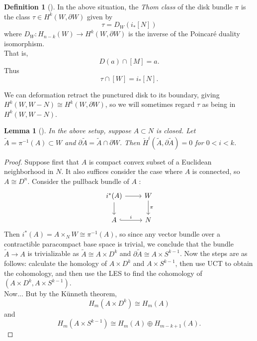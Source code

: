 \documentclass[reqno]{amsart}
\newtheorem{lemma}[theorem]{Lemma}
\theoremstyle{definition}
\newtheorem{definition}[theorem]{Definition}
\theoremstyle{remark}
\begin{document}
\begin{definition}[]
    In the above situation, the \textit{Thom class} of the
    disk bundle $\pi$ is the class $\tau \in 
    H^{k}\left( W, \partial W \right) $ given by
    \[
    \tau = D_W \left( i_* \left[ N \right]  \right) 
    \] 
    where $D_W \colon H_{n-k} (W) \to H^{k}(W, \partial W)$ is
    the inverse of the Poincaré duality isomorphism.\\
    That is,
    \[
    D(a) \cap \left[ M \right]  = a.
    \] 
    Thus
    \[
    \tau \cap \left[ W \right] =
    i_* \left[ N \right] .
    \] 
\end{definition}

We can deformation retract the punctured disk to its boundary, giving
$H^{k}(W, W-N) \cong H^{k}(W, \partial W)$, so we will
sometimes regard
$\tau$ as being in $H^{k}(W, W-N)$.

\begin{lemma}[]
    In the above setup, suppose
    $A \subset N$ is closed. Let
    $\tilde{A} = \pi^{-1}(A) \subset W$ and
    $\partial \tilde{A} = \tilde{A} \cap \partial W$.
    Then
    $\check{H}^{i}\left( \tilde{A},
    \partial \tilde{A} \right) = 0$ for 
    $0<i < k$.
\end{lemma}

\begin{proof}
    Suppose first that
    $A$ is compact convex subset
    of a Euclidean neighborhood in $N$. It also
    suffices consider the case where $A$ is connected,
    so $A \cong D^{n}$.
    Consider the pullback bundle of $A$ :
    \begin{equation*}
    \begin{tikzcd}
        i^{*}(A) \ar[r] \ar[d] & W \ar[d, "\pi"] \\
        A \ar[r, hookrightarrow, "i"] & N
    \end{tikzcd}
    \end{equation*}
    Then
    $i^{*}(A) =
    A \times_{N} W \cong
    \pi^{-1}(A)$, so
    since any vector bundle over a contractible paracompact
    base space is trivial, we conclude that 
    the bundle
    $\tilde{A} \to A$ is trivializable as
    $\tilde{A} \cong A \times D^{k}$ 
    and $\partial \tilde{A} \cong
    A \times S^{k-1}$.
    Now the steps are as follows: calculate
    the homology of 
    $A \times D^{k} $ and
    $A \times S^{k-1} $, then use UCT to obtain
    the cohomology, and then use the LES to find the cohomology
    of
    $\left( A \times D^{k}, A \times S^{k-1} \right) $.\\
    Now...
    But
    by the Künneth theorem,
    \[
    H_m(A \times D^{k}) \cong
    H_m(A)
    \] 
    and
    \[
    H_m(A \times S^{k-1}) \cong
    H_m(A) \oplus H_{m-k+1}(A).
    \] 
\end{proof}
\end{document}
